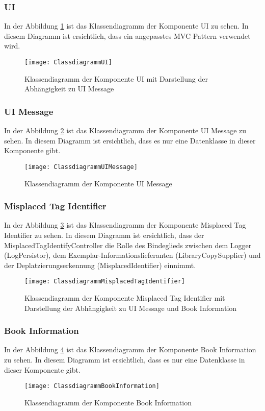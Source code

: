 \clearpage
\subsubsection{UI}
In der Abbildung \ref{fig:ClassUI} ist das Klassendiagramm der Komponente UI zu sehen.
In diesem Diagramm ist ersichtlich, dass ein angepasstes MVC Pattern verwendet wird.
\begin{figure}[htb]
	\centering
	\texttt{[image: ClassdiagrammUI]}
	\caption{Klassendiagramm der Komponente UI mit Darstellung der Abhängigkeit zu UI Message}
	\label{fig:ClassUI}
\end{figure}
\subsubsection{UI Message}
In der Abbildung \ref{fig:ClassUIMessage} ist das Klassendiagramm der Komponente UI Message zu sehen.
In diesem Diagramm ist ersichtlich, dass es nur eine Datenklasse in dieser Komponente gibt.
\begin{figure}[htb]
	\centering
	\texttt{[image: ClassdiagrammUIMessage]}
	\caption{Klassendiagramm der Komponente UI Message}
	\label{fig:ClassUIMessage}
\end{figure}

\clearpage
\subsubsection{Misplaced Tag Identifier}
In der Abbildung \ref{fig:ClassMisplacedTagIdentifier} ist das Klassendiagramm der Komponente Misplaced Tag Identifier zu sehen.
In diesem Diagramm ist ersichtlich, dass der MisplacedTagIdentifyController die Rolle des Bindeglieds zwischen dem Logger (LogPersistor), dem Exemplar-Informationslieferanten (LibraryCopySupplier) und der Deplatzierungserkennung (MisplacedIdentifier) einnimmt.
\begin{figure}[htb]
	\centering
	\texttt{[image: ClassdiagrammMisplacedTagIdentifier]}
	\caption{Klassendiagramm der Komponente Misplaced Tag Identifier mit Darstellung der Abhängigkeit zu UI Message und Book Information}
	\label{fig:ClassMisplacedTagIdentifier}
\end{figure}

\subsubsection{Book Information}
In der Abbildung \ref{fig:ClassBookInformation} ist das Klassendiagramm der Komponente Book Information zu sehen.
In diesem Diagramm ist ersichtlich, dass es nur eine Datenklasse in dieser Komponente gibt.
\begin{figure}[htb]
	\centering
	\texttt{[image: ClassdiagrammBookInformation]}
	\caption{Klassendiagramm der Komponente Book Information}
	\label{fig:ClassBookInformation}
\end{figure}

